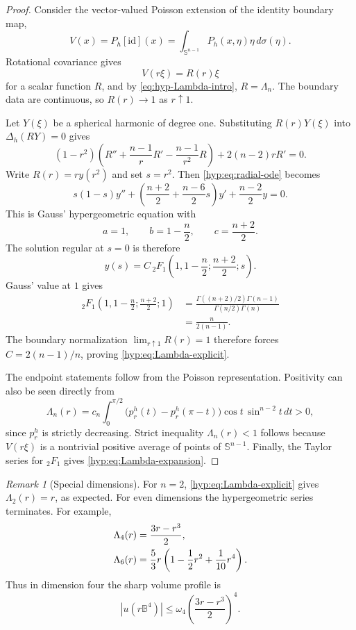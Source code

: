 \documentclass[11pt,reqno]{amsart}
\theoremstyle{remark}
\newtheorem{remark}[theorem]{Remark}
\newcommand{\B}{\mathbb B}
\newcommand{\Sph}{\mathbb S}
\newcommand{\Ph}{P_h}
\newcommand{\Dh}{\Delta_h}
\newcommand{\id}{\mathrm{id}}
\begin{document}
\begin{proof}
Consider the vector-valued Poisson extension of the identity boundary map,
\[
 V(x)=P_h[\id](x)=\int_{\Sph^{n-1}}\Ph(x,\eta)\eta\,d\sigma(\eta).
\]
Rotational covariance gives
\begin{equation}\label{hyp:eq:V-radial}
 V(r\xi)=R(r)\xi
\end{equation}
for a scalar function $R$, and by \eqref{eq:hyp-Lambda-intro}, $R=\Lambda_n$. The boundary data are continuous, so $R(r)\to1$ as $r\uparrow1$.

Let $Y(\xi)$ be a spherical harmonic of degree one. Substituting $R(r)Y(\xi)$ into $\Dh(RY)=0$ gives
\begin{equation}\label{hyp:eq:radial-ode}
 (1-r^2)\left(R''+\frac{n-1}{r}R'-\frac{n-1}{r^2}R\right)
 +2(n-2)rR'=0.
\end{equation}
Write $R(r)=r y(r^2)$ and set $s=r^2$. Then \eqref{hyp:eq:radial-ode} becomes
\begin{equation}\label{hyp:eq:hypergeom-ode}
 s(1-s)y''+
 \left(\frac{n+2}{2}+\frac{n-6}{2}s\right)y'
 +\frac{n-2}{2}y=0.
\end{equation}
This is Gauss' hypergeometric equation with
\[
 a=1,\qquad b=1-\frac n2,\qquad c=\frac{n+2}{2}.
\]
The solution regular at $s=0$ is therefore
\[
 y(s)=C\,{}_2F_1\!\left(1,1-\frac n2;\frac{n+2}{2};s\right).
\]
Gauss' value at $1$ gives
\begin{align*}
 {}_2F_1\!\left(1,1-\frac n2;\frac{n+2}{2};1\right)
 &=\frac{\Gamma((n+2)/2)\Gamma(n-1)}
 {\Gamma(n/2)\Gamma(n)}\\
 &=\frac{n}{2(n-1)}.
\end{align*}
The boundary normalization $\lim_{r\uparrow1}R(r)=1$ therefore forces $C=2(n-1)/n$, proving \eqref{hyp:eq:Lambda-explicit}.

The endpoint statements follow from the Poisson representation. Positivity can also be seen directly from
\[
 \Lambda_n(r)
 =c_n\int_0^{\pi/2}
 \bigl(p_r^h(t)-p_r^h(\pi-t)\bigr)
 \cos t\,\sin^{n-2}t\,dt>0,
\]
since $p_r^h$ is strictly decreasing. Strict inequality $\Lambda_n(r)<1$ follows because $V(r\xi)$ is a nontrivial positive average of points of $\Sph^{n-1}$. Finally, the Taylor series for ${}_2F_1$ gives \eqref{hyp:eq:Lambda-expansion}.
\end{proof}

\begin{remark}[Special dimensions]\label{hyp:rem:special-dimensions}
For $n=2$, \eqref{hyp:eq:Lambda-explicit} gives $\Lambda_2(r)=r$, as expected. For even dimensions the hypergeometric series terminates. For example,
\begin{align}\label{hyp:eq:special-lambda}
 \Lambda_4(r)&=\frac{3r-r^3}{2},\\
 \Lambda_6(r)&=\frac53 r\left(1-\frac12r^2+\frac1{10}r^4\right).\notag
\end{align}
Thus in dimension four the sharp volume profile is
\[
 |u(r\B^4)|\le\omega_4\left(\frac{3r-r^3}{2}\right)^4.
\]
\end{remark}
\end{document}
